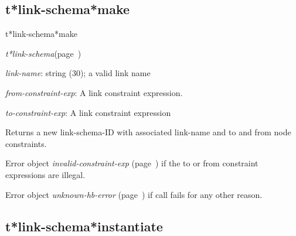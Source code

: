 \subsection{t*link-schema*make}
\label{t*link-schema*make}

\begin{description}
\item [Name:]  t*link-schema*make

\item [Class:] {\sl t*link-schema}\hfill(page~\pageref{t*link-schema})

\item [Parameters:]
\item {\sl link-name}:  string (30); a valid link name

\item {\sl from-constraint-exp}:  A link constraint expression.


\item {\sl to-constraint-exp}:  A link constraint expression



\item [Return-value:]

Returns a new link-schema-ID with 
associated link-name and to and from node constraints. 

Error object {\sl invalid-constraint-exp} (page~\pageref{invalid-constraint-exp}) if the to
or from constraint expressions are illegal.

Error object {\sl unknown-hb-error} (page~\pageref{unknown-hb-error}) if call fails for
any other reason. 


\item [Description:]


\item [Public:]



\end{description}
\horizontalline

\subsection{t*link-schema*instantiate}
\label{t*link-schema*instantiate}

